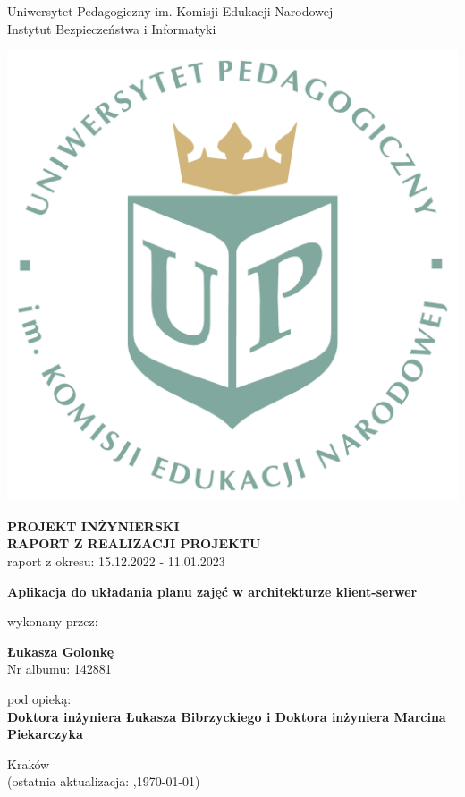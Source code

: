 \documentclass[12pt,a4paper,oneside]{article}
\theoremstyle{definition}
\numberwithin{equation}{section}
\begin{document}

\thispagestyle{empty}
\begin{titlepage}
\begin{center}\Large
Uniwersytet Pedagogiczny im. Komisji Edukacji Narodowej \\
\large
Instytut Bezpieczeństwa i Informatyki\\
\vskip 10pt
\end{center}
\begin{center}
\centering \includegraphics[width=0.4\columnwidth]{../resources/images/logoUP_pl.pdf}
\end{center}

\begin{center}
 {\bf \fontsize{14pt}{14pt}\selectfont PROJEKT INŻYNIERSKI \\ RAPORT Z REALIZACJI PROJEKTU\\
 }
 {\fontsize{12pt}{12pt} raport z okresu: 15.12.2022 - 11.01.2023}
\end{center}
\vskip 5pt
\begin{center}
 {\bf \fontsize{22pt}{22pt}\selectfont Aplikacja do układania planu zajęć w architekturze klient-serwer}
\end{center}

\begin{center}
 {\fontsize{12pt}{12pt}\selectfont wykonany przez: }
\end{center}
\begin{center}
 {\bf\fontsize{16pt}{16pt}\selectfont Łukasza Golonkę}\\
 {\fontsize{12pt}{12pt}\selectfont Nr albumu: 142881 \\}
\end{center}
\begin{center}
 {\fontsize{12pt}{12pt}\selectfont pod opieką:}\\
 {\bf\fontsize{12pt}{12pt}\selectfont Doktora inżyniera Łukasza Bibrzyckiego i Doktora inżyniera Marcina Piekarczyka}
\end{center}

\vspace*{\fill}
\begin{center}
\large
Kraków \the\year\\
(ostatnia aktualizacja: \DTMcurrenttime,\;\today)
\end{center}
\end{titlepage}
\setcounter{page}{0} 
\newpage\null\thispagestyle{empty}
\end{document}
